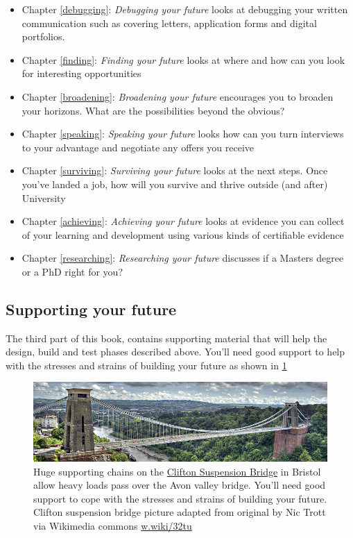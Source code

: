 \documentclass[
]{book}
\providecommand{\tightlist}{%
  \setlength{\itemsep}{0pt}\setlength{\parskip}{0pt}}
\begin{document}
\begin{itemize}
\tightlist
\item
  Chapter \ref{debugging}: \emph{Debugging your future} looks at debugging your written communication such as covering letters, application forms and digital portfolios.
\item
  Chapter \ref{finding}: \emph{Finding your future} looks at where and how can you look for interesting opportunities
\item
  Chapter \ref{broadening}: \emph{Broadening your future} encourages you to broaden your horizons. What are the possibilities beyond the obvious?
\item
  Chapter \ref{speaking}: \emph{Speaking your future} looks how can you turn interviews to your advantage and negotiate any offers you receive
\item
  Chapter \ref{surviving}: \emph{Surviving your future} looks at the next steps. Once you've landed a job, how will you survive and thrive outside (and after) University
\item
  Chapter \ref{achieving}: \emph{Achieving your future} looks at evidence you can collect of your learning and development using various kinds of certifiable evidence
\item
  Chapter \ref{researching}: \emph{Researching your future} discusses if a Masters degree or a PhD right for you?
\end{itemize}

\hypertarget{partiii}{%
\subsection{Supporting your future}\label{partiii}}

The third part of this book, contains supporting material that will help the design, build and test phases described above. You'll need good support to help with the stresses and strains of building your future as shown in \ref{fig:clifton-fig}

\begin{figure}

{\centering \includegraphics[width=1\linewidth]{images/clifton} 

}

\caption{Huge supporting chains on the \href{https://en.wikipedia.org/wiki/Clifton_Suspension_Bridge}{Clifton Suspension Bridge} in Bristol allow heavy loads pass over the Avon valley bridge. You'll need good support to cope with the stresses and strains of building your future. Clifton suspension bridge picture adapted from original by Nic Trott via Wikimedia commons \href{https://w.wiki/32tu}{w.wiki/32tu}}\label{fig:clifton-fig}
\end{figure}
\end{document}
